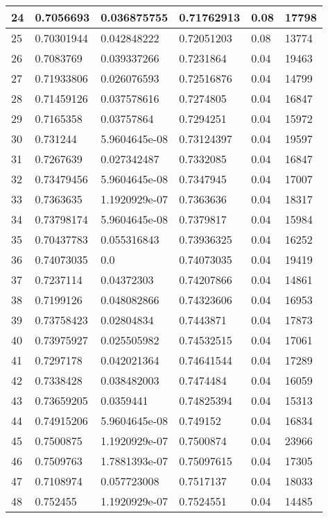 \begin{longtable}{|l|l|l|l|l|l|}
24 & 0.7056693 & 0.036875755 & 0.71762913 & 0.08 & 17798 \\ \hline 
25 & 0.70301944 & 0.042848222 & 0.72051203 & 0.08 & 13774 \\ \hline 
26 & 0.7083769 & 0.039337266 & 0.7231864 & 0.04 & 19463 \\ \hline 
27 & 0.71933806 & 0.026076593 & 0.72516876 & 0.04 & 14799 \\ \hline 
28 & 0.71459126 & 0.037578616 & 0.7274805 & 0.04 & 16847 \\ \hline 
29 & 0.7165358 & 0.03757864 & 0.7294251 & 0.04 & 15972 \\ \hline 
30 & 0.731244 & 5.9604645e-08 & 0.73124397 & 0.04 & 19597 \\ \hline 
31 & 0.7267639 & 0.027342487 & 0.7332085 & 0.04 & 16847 \\ \hline 
32 & 0.73479456 & 5.9604645e-08 & 0.7347945 & 0.04 & 17007 \\ \hline 
33 & 0.7363635 & 1.1920929e-07 & 0.7363636 & 0.04 & 18317 \\ \hline 
34 & 0.73798174 & 5.9604645e-08 & 0.7379817 & 0.04 & 15984 \\ \hline 
35 & 0.70437783 & 0.055316843 & 0.73936325 & 0.04 & 16252 \\ \hline 
36 & 0.74073035 & 0.0 & 0.74073035 & 0.04 & 19419 \\ \hline 
37 & 0.7237114 & 0.04372303 & 0.74207866 & 0.04 & 14861 \\ \hline 
38 & 0.7199126 & 0.048082866 & 0.74323606 & 0.04 & 16953 \\ \hline 
39 & 0.73758423 & 0.02804834 & 0.7443871 & 0.04 & 17873 \\ \hline 
40 & 0.73975927 & 0.025505982 & 0.74532515 & 0.04 & 17061 \\ \hline 
41 & 0.7297178 & 0.042021364 & 0.74641544 & 0.04 & 17289 \\ \hline 
42 & 0.7338428 & 0.038482003 & 0.7474484 & 0.04 & 16059 \\ \hline 
43 & 0.73659205 & 0.0359441 & 0.74825394 & 0.04 & 15313 \\ \hline 
44 & 0.74915206 & 5.9604645e-08 & 0.749152 & 0.04 & 16834 \\ \hline 
45 & 0.7500875 & 1.1920929e-07 & 0.7500874 & 0.04 & 23966 \\ \hline 
46 & 0.7509763 & 1.7881393e-07 & 0.75097615 & 0.04 & 17305 \\ \hline 
47 & 0.7108974 & 0.057723008 & 0.7517137 & 0.04 & 18033 \\ \hline 
48 & 0.752455 & 1.1920929e-07 & 0.7524551 & 0.04 & 14485 \\ \hline 

\end{longtable}
